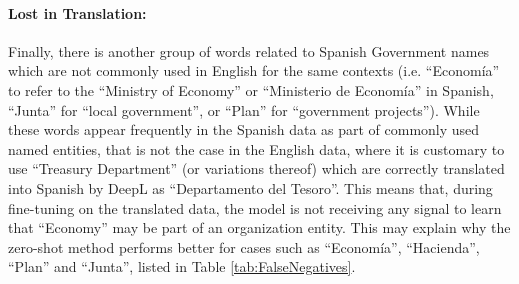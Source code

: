 \documentclass[11pt]{article}
\begin{document}
\paragraph{Lost in Translation:} Finally, there is another group of words related to Spanish Government names which are not commonly used in English for the same contexts (i.e. ``Economía'' to refer to the ``Ministry of Economy'' or ``Ministerio de Economía'' in Spanish, ``Junta'' for ``local government'', or ``Plan'' for ``government projects''). While these words appear frequently in the Spanish data as part of commonly used named entities, that is not the case in the English data, where it is customary to use ``Treasury Department'' (or variations thereof) which are correctly translated into Spanish by DeepL as ``Departamento del Tesoro''. This means that, during fine-tuning on the translated data, the model is not receiving any signal to learn that ``Economy'' may be part of an organization entity. This may explain why the zero-shot method performs better for cases such as ``Economía'', ``Hacienda'', ``Plan'' and ``Junta'', listed in Table \ref{tab:FalseNegatives}.
\end{document}
